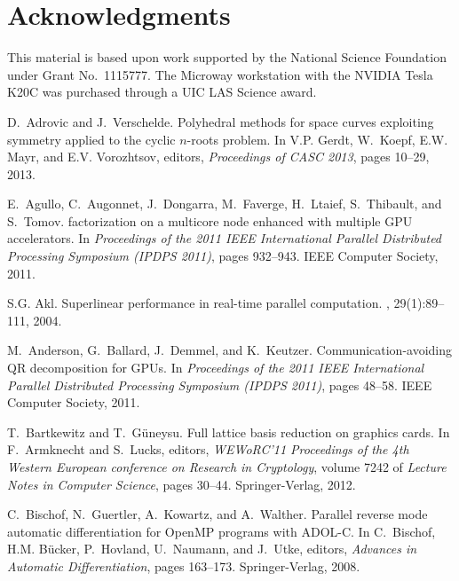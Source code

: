 \documentclass{article}
\begin{document}
\section*{Acknowledgments} 

This material is based upon work supported 
by the National Science Foundation under Grant No.\ 1115777.
The Microway workstation with the NVIDIA Tesla K20C 
was purchased through a UIC LAS Science award.





\begin{thebibliography}{10}

D.~Adrovic and J.~Verschelde.
\newblock Polyhedral methods for space curves exploiting symmetry applied to
  the cyclic $n$-roots problem.
\newblock In V.P. Gerdt, W.~Koepf, E.W. Mayr, and E.V. Vorozhtsov, editors,
  {\em Proceedings of CASC 2013}, pages 10--29, 2013.

E.~Agullo, C.~Augonnet, J.~Dongarra, M.~Faverge, H.~Ltaief, S.~Thibault, and
  S.~Tomov.
 factorization on a multicore node enhanced with multiple {GPU}
  accelerators.
\newblock In {\em Proceedings of the 2011 IEEE International Parallel
  Distributed Processing Symposium (IPDPS 2011)}, pages 932--943. IEEE Computer
  Society, 2011.

S.G. Akl.
\newblock Superlinear performance in real-time parallel computation.
, 29(1):89--111, 2004.

M.~Anderson, G.~Ballard, J.~Demmel, and K.~Keutzer.
\newblock Communication-avoiding {QR} decomposition for {GPU}s.
\newblock In {\em Proceedings of the 2011 IEEE International Parallel
  Distributed Processing Symposium (IPDPS 2011)}, pages 48--58. IEEE Computer
  Society, 2011.

T.~Bartkewitz and T.~G{\"{u}}neysu.
\newblock Full lattice basis reduction on graphics cards.
\newblock In F.~Armknecht and S.~Lucks, editors, {\em WEWoRC'11 Proceedings of
  the 4th Western European conference on Research in Cryptology}, volume 7242
  of {\em Lecture Notes in Computer Science}, pages 30--44. Springer-Verlag,
  2012.

C.~Bischof, N.~Guertler, A.~Kowartz, and A.~Walther.
\newblock Parallel reverse mode automatic differentiation for {OpenMP} programs
  with {ADOL-C}.
\newblock In C.~Bischof, H.M. B{\"{u}}cker, P.~Hovland, U.~Naumann, and
  J.~Utke, editors, {\em Advances in Automatic Differentiation}, pages
  163--173. Springer-Verlag, 2008.


\end{thebibliography}
\end{document}
